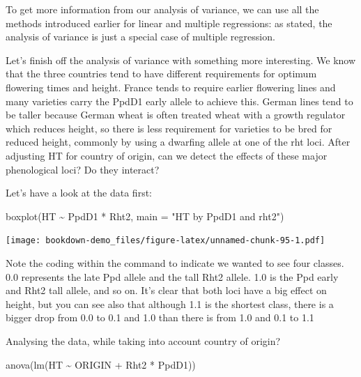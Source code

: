 \documentclass[
]{book}
\newenvironment{Shaded}{\begin{snugshade}}{\end{snugshade}}
\newcommand{\AttributeTok}[1]{\textcolor[rgb]{0.77,0.63,0.00}{#1}}
\newcommand{\FunctionTok}[1]{\textcolor[rgb]{0.00,0.00,0.00}{#1}}
\newcommand{\NormalTok}[1]{#1}
\newcommand{\SpecialCharTok}[1]{\textcolor[rgb]{0.00,0.00,0.00}{#1}}
\newcommand{\StringTok}[1]{\textcolor[rgb]{0.31,0.60,0.02}{#1}}
\begin{document}
To get more information from our analysis of variance, we can use all the methods introduced earlier for linear and multiple regressions: as stated, the analysis of variance is just a special case of multiple regression.

Let's finish off the analysis of variance with something more interesting. We know that the three countries tend to have different requirements for optimum flowering times and height. France tends to require earlier flowering lines and many varieties carry the PpdD1 early allele to achieve this. German lines tend to be taller because German wheat is often treated wheat with a growth regulator which reduces height, so there is less requirement for varieties to be bred for reduced height, commonly by using a dwarfing allele at one of the rht loci. After adjusting HT for country of origin, can we detect the effects of these major phenological loci? Do they interact?

Let's have a look at the data first:

\begin{Shaded}
\begin{Highlighting}[]
\FunctionTok{boxplot}\NormalTok{(HT }\SpecialCharTok{\textasciitilde{}}\NormalTok{ PpdD1 }\SpecialCharTok{*}\NormalTok{ Rht2, }\AttributeTok{main =} \StringTok{"HT by PpdD1 and rht2"}\NormalTok{)}
\end{Highlighting}
\end{Shaded}

\texttt{[image: bookdown-demo\_files/figure-latex/unnamed-chunk-95-1.pdf]}

Note the coding within the command to indicate we wanted to see four classes. 0.0 represents the late Ppd allele and the tall Rht2 allele. 1.0 is the Ppd early and Rht2 tall allele, and so on. It's clear that both loci have a big effect on height, but you can see also that although 1.1 is the shortest class, there is a bigger drop from 0.0 to 0.1 and 1.0 than there is from 1.0 and 0.1 to 1.1

Analysing the data, while taking into account country of origin?

\begin{Shaded}
\begin{Highlighting}[]
\FunctionTok{anova}\NormalTok{(}\FunctionTok{lm}\NormalTok{(HT }\SpecialCharTok{\textasciitilde{}}\NormalTok{ ORIGIN }\SpecialCharTok{+}\NormalTok{ Rht2 }\SpecialCharTok{*}\NormalTok{ PpdD1))}
\end{Highlighting}
\end{Shaded}
\end{document}
